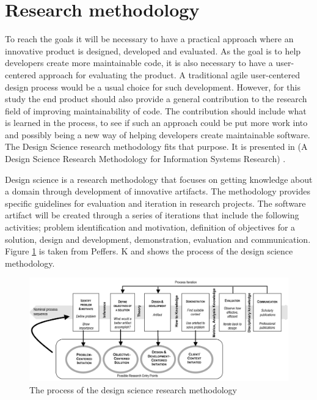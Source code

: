 \documentclass[pdftex,10pt,b5paper,twoside]{report}
\begin{document}
\section{Research methodology}
To reach the goals it will be necessary to have a practical approach where an innovative product is designed, developed and evaluated. As the goal is to help developers create more maintainable code, it is also necessary to have a user-centered approach for evaluating the product. A traditional agile user-centered design process would be a usual choice for such development. However, for this study the end product should also provide a general contribution to the research field of improving maintainability of code. The contribution should include what is learned in the process, to see if such an approach could be put more work into and possibly being a new way of helping developers create maintainable software. The Design Science research methodology fits that purpose. It is presented in (A Design Science Research Methodology for Information Systems Research) \cite{Peffers2007ADS}.

Design science is a research methodology that focuses on getting knowledge about a domain through development of innovative artifacts. The methodology provides specific guidelines for evaluation and iteration in research projects. The software artifact will be created through a series of iterations that include the following activities; problem identification and motivation, definition of objectives for a solution, design and development, demonstration, evaluation and communication. Figure \ref{fig:designScience} is taken from Peffers. K \cite{Peffers2007ADS} and shows the process of the design science methodology. 

\begin{figure}[h!]
    \centering
    \includegraphics[width=\textwidth]{report/images/designScience.png}
    \caption{The process of the design science research methodology}
    \label{fig:designScience}
\end{figure}
\end{document}
